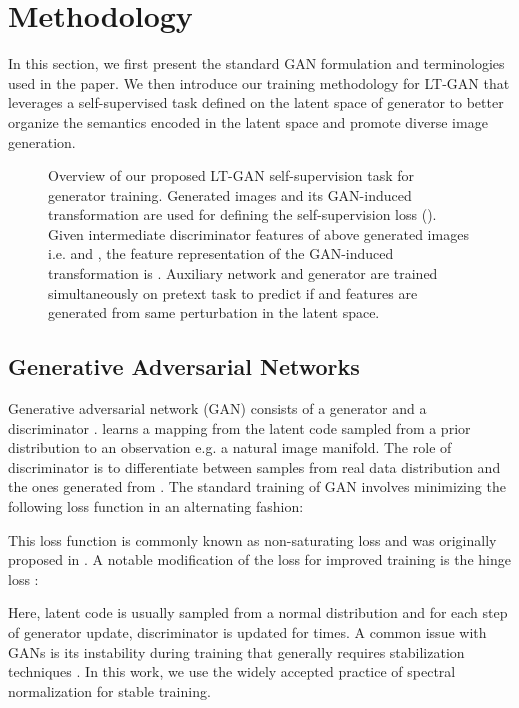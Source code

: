 \documentclass[10pt,twocolumn,letterpaper]{article}
\begin{document}
\section{Methodology}
In this section, we first present the standard GAN formulation and terminologies used in the paper. We then introduce our training methodology for LT-GAN that leverages a self-supervised task defined on the latent space of generator to better organize the semantics encoded in the latent space and promote diverse image generation.


\begin{figure*}[t]
\centering
{}
   \caption{\footnotesize{Overview of our proposed LT-GAN self-supervision task for generator training. Generated images  and its GAN-induced transformation  are used for defining the self-supervision loss (). Given intermediate discriminator features of above generated images i.e.  and , the feature representation of the GAN-induced transformation is . Auxiliary network  and generator  are trained simultaneously on pretext task to predict if  and   features are generated from same  perturbation in the latent space. }}
\label{fig:flowchart}
\end{figure*}

\subsection{Generative Adversarial Networks} 
Generative adversarial network (GAN) consists of a generator  and a discriminator .  learns a mapping from the latent code  sampled from a prior distribution  to an observation  e.g. a natural image manifold. The role of discriminator  is to differentiate between samples from real data distribution  and the ones generated from . The standard training of GAN involves minimizing the following loss function in an alternating fashion:

This loss function is commonly known as non-saturating loss and was originally proposed in \cite{gan_goodfellow}. A notable modification of the loss for improved training is the hinge loss \cite{hinge_loss_gan}: 


Here, latent code  is usually sampled from a normal distribution and for each step of generator update, discriminator is updated for  times. A common issue with GANs is its instability during training that generally requires stabilization techniques \cite{inception2016,wgan_improved,sngan_proj}. In this work, we use the widely accepted practice of spectral normalization \cite{sngan_proj,biggan2018brock} for stable training. 
\end{document}
